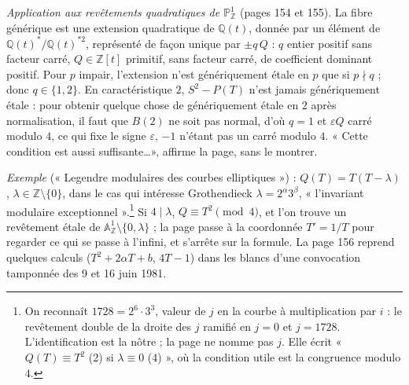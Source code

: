\documentclass[11pt,a4paper]{article}
\begin{document}
\emph{Application aux revêtements quadratiques de $\mathbb{P}^1_{\mathbb{Z}}$}
(pages 154 et 155). La fibre générique est une extension quadratique de
$\mathbb{Q}(t)$, donnée par un élément de $\mathbb{Q}(t)^{*}/\mathbb{Q}(t)^{*2}$,
représenté de façon unique par $\pm q\, Q$ : $q$ entier positif sans facteur
carré, $Q \in \mathbb{Z}[t]$ primitif, sans facteur carré, de coefficient dominant
positif. Pour $p$ impair, l'extension n'est génériquement étale en $p$ que si
$p \nmid q$ ; donc $q \in \{1, 2\}$. En caractéristique $2$, $S^2 - P(T)$ n'est
jamais génériquement étale : pour obtenir quelque chose de génériquement étale
en $2$ après normalisation, il faut que $B(2)$ ne soit pas normal, d'où $q = 1$
et $\varepsilon Q$ carré modulo $4$, ce qui fixe le signe $\varepsilon$, $-1$
n'étant pas un carré modulo $4$. « Cette condition est aussi suffisante\ldots »,
affirme la page, sans le montrer.

\emph{Exemple} (« Legendre modulaires des courbes elliptiques ») : $Q(T) = T(T -
\lambda)$, $\lambda \in \mathbb{Z} \setminus \{0\}$, dans le cas qui intéresse
Grothendieck $\lambda = 2^\alpha 3^\beta$, « l'invariant modulaire
exceptionnel ».\footnote{On reconnaît $1728 = 2^6 \cdot 3^3$, valeur de $j$ en la
courbe à multiplication par $i$ : le revêtement double de la droite des $j$
ramifié en $j = 0$ et $j = 1728$. L'identification est la nôtre ; la page ne
nomme pas $j$. Elle écrit « $Q(T) \equiv T^2$ (2) si $\lambda \equiv 0$ (4) »,
où la condition utile est la congruence modulo $4$.} Si $4 \mid \lambda$, $Q
\equiv T^2 \pmod 4$, et l'on trouve un revêtement étale de $\mathbb{A}^1_{\mathbb{Z}}
\setminus \{0, \lambda\}$ ; la page passe à la coordonnée $T' = 1/T$ pour
regarder ce qui se passe à l'infini, et s'arrête sur la formule. La page 156
reprend quelques calculs ($T^2 + 2\alpha T + b$, $4T - 1$) dans les blancs d'une
convocation tamponnée des 9 et 16 juin 1981.
\end{document}
